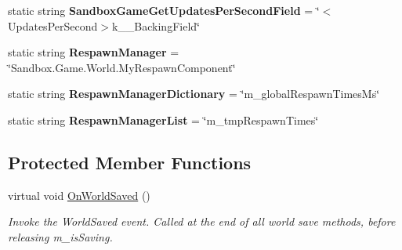 \begin{DoxyCompactItemize}
\item 
\hypertarget{class_s_e_mod_a_p_i_internal_1_1_a_p_i_1_1_common_1_1_world_manager_a15f11fce71acf5d15587bd12e062406b}{}static string {\bfseries Sandbox\+Game\+Get\+Updates\+Per\+Second\+Field} = \char`\"{}$<$Updates\+Per\+Second$>$k\+\_\+\+\_\+\+Backing\+Field\char`\"{}\label{class_s_e_mod_a_p_i_internal_1_1_a_p_i_1_1_common_1_1_world_manager_a15f11fce71acf5d15587bd12e062406b}

\item 
\hypertarget{class_s_e_mod_a_p_i_internal_1_1_a_p_i_1_1_common_1_1_world_manager_ac637bd5c8ba5e93127fe5c47d32df44f}{}static string {\bfseries Respawn\+Manager} = \char`\"{}Sandbox.\+Game.\+World.\+My\+Respawn\+Component\char`\"{}\label{class_s_e_mod_a_p_i_internal_1_1_a_p_i_1_1_common_1_1_world_manager_ac637bd5c8ba5e93127fe5c47d32df44f}

\item 
\hypertarget{class_s_e_mod_a_p_i_internal_1_1_a_p_i_1_1_common_1_1_world_manager_a19a366f3a9d8975d5ba970e2546cf723}{}static string {\bfseries Respawn\+Manager\+Dictionary} = \char`\"{}m\+\_\+global\+Respawn\+Times\+Ms\char`\"{}\label{class_s_e_mod_a_p_i_internal_1_1_a_p_i_1_1_common_1_1_world_manager_a19a366f3a9d8975d5ba970e2546cf723}

\item 
\hypertarget{class_s_e_mod_a_p_i_internal_1_1_a_p_i_1_1_common_1_1_world_manager_a2c2a0ae710d5ad430ce172536bd332ef}{}static string {\bfseries Respawn\+Manager\+List} = \char`\"{}m\+\_\+tmp\+Respawn\+Times\char`\"{}\label{class_s_e_mod_a_p_i_internal_1_1_a_p_i_1_1_common_1_1_world_manager_a2c2a0ae710d5ad430ce172536bd332ef}

\end{DoxyCompactItemize}
\subsection*{Protected Member Functions}
\begin{DoxyCompactItemize}
\item 
virtual void \hyperlink{class_s_e_mod_a_p_i_internal_1_1_a_p_i_1_1_common_1_1_world_manager_a1da5f2acd6fb682a9c78bdee56b9785f}{On\+World\+Saved} ()
\begin{DoxyCompactList}\small\item\em Invoke the World\+Saved event. Called at the end of all world save methods, before releasing m\+\_\+is\+Saving.\end{DoxyCompactList}\end{DoxyCompactItemize}
